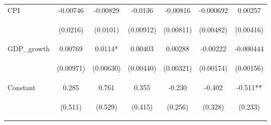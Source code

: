 \begin{tabular}{lcccccc}
CPI & -0.00746 & -0.00829 & -0.0136 & -0.00816 & -0.000692 & 0.00257 \\
\vspace{4pt} & \begin{footnotesize}(0.0216)\end{footnotesize} & \begin{footnotesize}(0.0101)\end{footnotesize} & \begin{footnotesize}(0.00912)\end{footnotesize} & \begin{footnotesize}(0.00811)\end{footnotesize} & \begin{footnotesize}(0.00482)\end{footnotesize} & \begin{footnotesize}(0.00416)\end{footnotesize} \\
GDP\_growth & 0.00769 & 0.0114* & 0.00403 & 0.00288 & -0.00222 & -0.000444 \\
\vspace{4pt} & \begin{footnotesize}(0.00971)\end{footnotesize} & \begin{footnotesize}(0.00630)\end{footnotesize} & \begin{footnotesize}(0.00440)\end{footnotesize} & \begin{footnotesize}(0.00321)\end{footnotesize} & \begin{footnotesize}(0.00174)\end{footnotesize} & \begin{footnotesize}(0.00156)\end{footnotesize} \\
Constant & 0.285 & 0.761 & 0.355 & -0.230 & -0.402 & -0.511** \\
 & \begin{footnotesize}(0.511)\end{footnotesize} & \begin{footnotesize}(0.529)\end{footnotesize} & \begin{footnotesize}(0.415)\end{footnotesize} & \begin{footnotesize}(0.256)\end{footnotesize} & \begin{footnotesize}(0.328)\end{footnotesize} & \begin{footnotesize}(0.233)\end{footnotesize} \\

\end{tabular}
